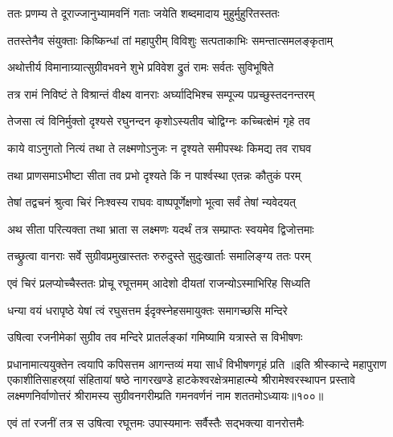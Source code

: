 \twolineshloka
{ततः प्रणम्य ते दूराज्जानुभ्यामवनिं गताः}
{जयेति शब्दमादाय मुहुर्मुहुरितस्ततः}%

\twolineshloka
{ततस्तेनैव संयुक्ताः किष्किन्धां तां महापुरीम्}
{विविशुः सत्पताकाभिः समन्तात्समलङ्कृताम्}%

\twolineshloka
{अथोत्तीर्य विमानाग्र्यात्सुग्रीवभवने शुभे}
{प्रविवेश द्रुतं रामः सर्वतः सुविभूषिते}%

\twolineshloka
{तत्र रामं निविष्टं ते विश्रान्तं वीक्ष्य वानराः}
{अर्घ्यादिभिश्च सम्पूज्य पप्रच्छुस्तदनन्तरम्}%


\twolineshloka
{तेजसा त्वं विनिर्मुक्तो दृश्यसे रघुनन्दन}
{कृशोऽस्यतीव चोद्विग्नः कच्चित्क्षेमं गृहे तव}%

\twolineshloka
{काये वाऽनुगतो नित्यं तथा ते लक्ष्मणोऽनुजः}
{न दृश्यते समीपस्थः किमद्य तव राघव}%

\twolineshloka
{तथा प्राणसमाऽभीष्टा सीता तव प्रभो}
{दृश्यते किं न पार्श्वस्था एतन्नः कौतुकं परम्}%


\twolineshloka
{तेषां तद्वचनं श्रुत्वा चिरं निःश्वस्य राघवः}
{वाष्पपूर्णेक्षणो भूत्वा सर्वं तेषां न्यवेदयत्}%

\twolineshloka
{अथ सीता परित्यक्ता तथा भ्राता स लक्ष्मणः}
{यदर्थं तत्र सम्प्राप्तः स्वयमेव द्विजोत्तमाः}%

\twolineshloka
{तच्छ्रुत्वा वानराः सर्वे सुग्रीवप्रमुखास्ततः}
{रुरुदुस्ते सुदुःखार्ताः समालिङ्ग्य ततः परम्}%

\twolineshloka
{एवं चिरं प्रलप्योच्चैस्ततः प्रोचू रघूत्तमम्}
{आदेशो दीयतां राजन्योऽस्माभिरिह सिध्यति}%

\twolineshloka
{धन्या वयं धरापृष्ठे येषां त्वं रघुसत्तम}
{ईदृक्स्नेहसमायुक्तः समागच्छसि मन्दिरे}%


\twolineshloka
{उषित्वा रजनीमेकां सुग्रीव तव मन्दिरे} 
{प्रातर्लङ्कां गमिष्यामि यत्रास्ते स विभीषणः}%

\twolineshloka
{प्रधानामात्ययुक्तेन त्वयापि कपिसत्तम}
{आगन्तव्यं मया सार्धं विभीषणगृहं प्रति}%
॥इति श्रीस्कान्दे महापुराण एकाशीतिसाहस्र्यां संहितायां षष्ठे नागरखण्डे हाटकेश्वरक्षेत्रमाहात्म्ये श्रीरामेश्वरस्थापन प्रस्तावे लक्ष्मणनिर्वाणोत्तरं श्रीरामस्य सुग्रीवनगरीम्प्रति गमनवर्णनं नाम शततमोऽध्यायः॥१००॥


\twolineshloka
{एवं तां रजनीं तत्र स उषित्वा रघूत्तमः}
{उपास्यमानः सर्वैस्तैः सद्भक्त्या वानरोत्तमैः}%

